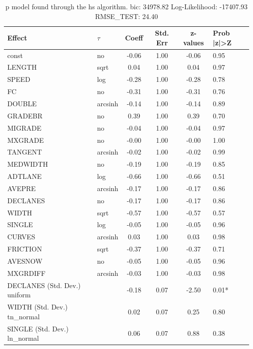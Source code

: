 \begin{table}
	\caption{p model found through the hs algorithm. bic: 34978.82 Log-Likelihood: -17407.93 RMSE_TEST: 24.40}
	\begin{center}
		\begin{tabular}{|l|l|c|c|c|l|}
			\hline
			Effect & $\tau$ & Coeff & Std. Err & z-values & Prob |z|>Z \\
			\hline
			const & no & -0.06 & 1.00 & -0.06 & 0.95 \\
			\hline
			LENGTH & sqrt & 0.04 & 1.00 & 0.04 & 0.97 \\
			\hline
			SPEED & log & -0.28 & 1.00 & -0.28 & 0.78 \\
			\hline
			FC & no & -0.31 & 1.00 & -0.31 & 0.76 \\
			\hline
			DOUBLE & arcsinh & -0.14 & 1.00 & -0.14 & 0.89 \\
			\hline
			GRADEBR & no & 0.39 & 1.00 & 0.39 & 0.70 \\
			\hline
			MIGRADE & no & -0.04 & 1.00 & -0.04 & 0.97 \\
			\hline
			MXGRADE & no & -0.00 & 1.00 & -0.00 & 1.00 \\
			\hline
			TANGENT & arcsinh & -0.02 & 1.00 & -0.02 & 0.99 \\
			\hline
			MEDWIDTH & no & -0.19 & 1.00 & -0.19 & 0.85 \\
			\hline
			ADTLANE & log & -0.66 & 1.00 & -0.66 & 0.51 \\
			\hline
			AVEPRE & arcsinh & -0.17 & 1.00 & -0.17 & 0.86 \\
			\hline
			DECLANES & no & -0.17 & 1.00 & -0.17 & 0.86 \\
			\hline
			WIDTH & sqrt & -0.57 & 1.00 & -0.57 & 0.57 \\
			\hline
			SINGLE & log & -0.05 & 1.00 & -0.05 & 0.96 \\
			\hline
			CURVES & arcsinh & 0.03 & 1.00 & 0.03 & 0.98 \\
			\hline
			FRICTION & sqrt & -0.37 & 1.00 & -0.37 & 0.71 \\
			\hline
			AVESNOW & no & -0.05 & 1.00 & -0.05 & 0.96 \\
			\hline
			MXGRDIFF & arcsinh & -0.03 & 1.00 & -0.03 & 0.98 \\
			\hline
			DECLANES (Std. Dev.) uniform &  & -0.18 & 0.07 & -2.50 & 0.01* \\
			\hline
			WIDTH (Std. Dev.) tn_normal &  & 0.02 & 0.07 & 0.25 & 0.80 \\
			\hline
			SINGLE (Std. Dev.) ln_normal &  & 0.06 & 0.07 & 0.88 & 0.38 \\

\end{tabular}
\end{center}
\end{table}
